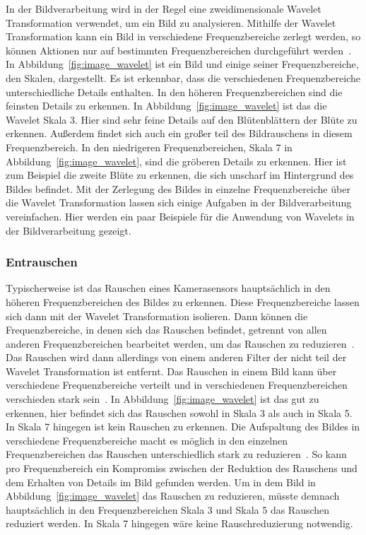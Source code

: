 \documentclass[12pt, a4paper, ngerman]{article}
\begin{document}
In der Bildverarbeitung wird in der Regel eine zweidimensionale Wavelet Transformation verwendet,
um ein Bild zu analysieren.
Mithilfe der Wavelet Transformation kann ein Bild in verschiedene Frequenzbereiche zerlegt werden,
so können Aktionen nur auf bestimmten Frequenzbereichen durchgeführt werden~\cite[S.38]{dt_manual}.
In Abbildung~\ref{fig:image_wavelet} ist ein Bild 
und einige seiner Frequenzbereiche, den Skalen, dargestellt.
Es ist erkennbar, dass die verschiedenen Frequenzbereiche unterschiedliche Details enthalten.
In den höheren Frequenzbereichen sind die feinsten Details zu erkennen.
In Abbildung~\ref{fig:image_wavelet} ist das die Wavelet Skala 3. 
Hier sind sehr feine Details auf den Blütenblättern der Blüte zu erkennen.
Außerdem findet sich auch ein großer teil des Bildrauschens in diesem Frequenzbereich.
In den niedrigeren Frequenzbereichen, Skala 7 in Abbildung~\ref{fig:image_wavelet},
sind die gröberen Details zu erkennen.
Hier ist zum Beispiel die zweite Blüte zu erkennen, 
die sich unscharf im Hintergrund des Bildes befindet.
Mit der Zerlegung des Bildes in einzelne Frequenzbereiche über die Wavelet Transformation
lassen sich einige Aufgaben in der Bildverarbeitung vereinfachen.
Hier werden ein paar Beispiele für die Anwendung von Wavelets in der Bildverarbeitung gezeigt.

\subsubsection{Entrauschen}

Typischerweise ist das Rauschen eines Kamerasensors
hauptsächlich in den höheren Frequenzbereichen des Bildes zu erkennen.
Diese Frequenzbereiche lassen sich dann mit der Wavelet Transformation isolieren.
Dann können die Frequenzbereiche, in denen sich das Rauschen befindet,
getrennt von allen anderen Frequenzbereichen bearbeitet werden,
um das Rauschen zu reduzieren~\cite[S.117]{dt_manual}.
Das Rauschen wird dann allerdings von einem anderen Filter
der nicht teil der Wavelet Transformation ist entfernt.
Das Rauschen in einem Bild kann über verschiedene Frequenzbereiche verteilt
und in verschiedenen Frequenzbereichen verschieden stark sein~\cite[S.119]{dt_manual}.
In Abbildung~\ref{fig:image_wavelet} ist das gut zu erkennen,
hier befindet sich das Rauschen sowohl in Skala 3 als auch in Skala 5.
In Skala 7 hingegen ist kein Rauschen zu erkennen.
Die Aufspaltung des Bildes in verschiedene Frequenzbereiche
macht es möglich in den einzelnen Frequenzbereichen
das Rauschen unterschiedlich stark zu reduzieren~\cite[S.119]{dt_manual}.
So kann pro Frequenzbereich ein Kompromiss zwischen der Reduktion des Rauschens
und dem Erhalten von Details im Bild gefunden werden.
Um in dem Bild in Abbildung~\ref{fig:image_wavelet} das Rauschen zu reduzieren,
müsste demnach hauptsächlich in den Frequenzbereichen Skala 3 und Skala 5
das Rauschen reduziert werden. 
In Skala 7 hingegen wäre keine Rauschreduzierung notwendig.
\end{document}

